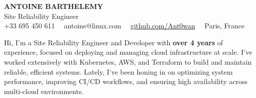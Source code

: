 \documentclass[10pt]{developercv}
\begin{document}
\begin{center}
    {\huge\textbf{\MakeUppercase{Antoine Barthelemy}}} \\
    \vspace{4pt}
    {\LARGE Site Reliability Engineer} \\
    \vspace{4pt}
	+33 695 450 611 \ \ antoine@linux.com \ \ \href{https://github.com/Ant0wan}{github.com/Ant0wan} \ \ Paris, France
\end{center}

\hspace{0pt}
\begin{minipage}[t]{1.00\textwidth}
\vspace{0pt}
{Hi, I’m a Site Reliability Engineer and Developer with \textbf{over 4 years} of experience, focused on deploying and managing cloud infrastructure at scale. I’ve worked extensively with Kubernetes, AWS, and Terraform to build and maintain reliable, efficient systems. Lately, I’ve been honing in on optimizing system performance, improving CI/CD workflows, and ensuring high availability across multi-cloud environments.}
\end{minipage}
\vspace{6pt}
\hfill

\end{document}
